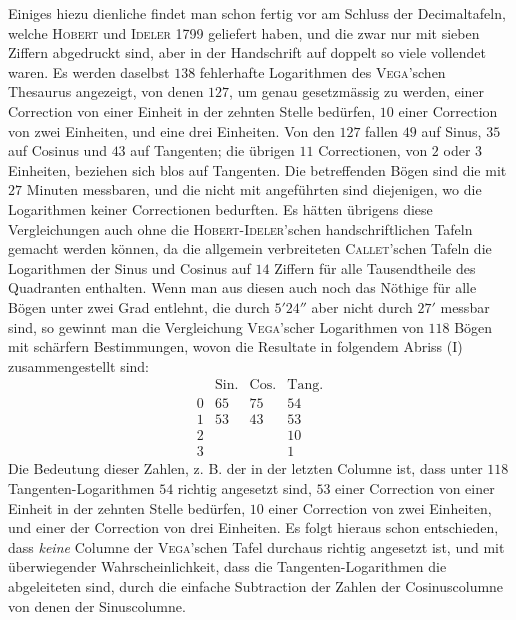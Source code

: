 Einiges hiezu dienliche findet man schon fertig vor am Schluss der Decimaltafeln, welche \textsc{Hobert} und \textsc{Ideler} 1799 geliefert haben, und die zwar nur mit
sieben Ziffern abgedruckt sind, aber in der Handschrift auf doppelt so viele vollendet waren. Es werden daselbst \(138\) fehlerhafte Logarithmen des \textsc{Vega}'schen
Thesaurus angezeigt, von denen \(127\), um genau gesetzmässig zu werden, einer
Correction von einer Einheit in der zehnten Stelle bedürfen, \(10\) einer Correction von
zwei Einheiten, und eine drei Einheiten. Von den \(127\) fallen \(49\) auf Sinus, \(35\)
auf Cosinus und \(43\) auf Tangenten; die übrigen \(11\) Correctionen, von \(2\) oder \(3\)
Einheiten, beziehen sich blos auf Tangenten. Die betreffenden Bögen sind die
mit \(27\) Minuten messbaren, und die nicht mit angeführten sind diejenigen, wo
die Logarithmen keiner Correctionen bedurften. Es hätten übrigens diese Vergleichungen auch ohne die \textsc{Hobert-Ideler}'schen handschriftlichen Tafeln gemacht
werden können, da die allgemein verbreiteten \textsc{Callet}'schen Tafeln die Logarithmen der Sinus und Cosinus auf \(14\) Ziffern für alle Tausendtheile des Quadranten
enthalten. Wenn man aus diesen auch noch das Nöthige für alle Bögen unter
zwei Grad entlehnt, die durch \(5'24''\) aber nicht durch \(27'\) messbar sind, so gewinnt man die Vergleichung \textsc{Vega}'scher Logarithmen von \(118\) Bögen mit schärfern Bestimmungen, wovon die Resultate in folgendem Abriss (I) zusammengestellt sind:
\[
\begin{array}{rccc}
 & \mathrm{Sin.} & \mathrm{Cos.} & \mathrm{Tang.} \\
0 & 65 & 75 & 54 \\
1 & 53 & 43 & 53 \\
2 &    &    & 10 \\
3 &    &    & 1
\end{array}
\]
Die Bedeutung dieser Zahlen, z. B. der in der letzten Columne ist, dass unter
\(118\) Tangenten-Logarithmen \(54\) richtig angesetzt sind, \(53\) einer Correction von
einer Einheit in der zehnten Stelle bedürfen, \(10\) einer Correction von zwei Einheiten, und einer der Correction von drei Einheiten. Es folgt hieraus schon entschieden, dass \emph{keine} Columne der \textsc{Vega}'schen Tafel durchaus richtig angesetzt
ist, und mit überwiegender Wahrscheinlichkeit, dass die Tangenten-Logarithmen
die abgeleiteten sind, durch die einfache Subtraction der Zahlen der Cosinuscolumne von denen der Sinuscolumne.

